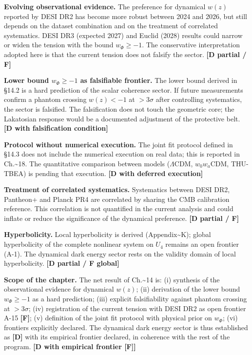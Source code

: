 ﻿\documentclass[11pt,letterpaper]{article}
\begin{document}
\textbf{Evolving observational evidence.} The preference for dynamical $w(z)$ reported by DESI DR2 has become more robust between 2024 and 2026, but still depends on the dataset combination and on the treatment of correlated systematics. DESI DR3 (expected 2027) and Euclid (2028) results could narrow or widen the tension with the bound $w_\Phi \geq -1$. The conservative interpretation adopted here is that the current tension does not falsify the sector. \textbf{[D partial / F]}

\textbf{Lower bound $w_\Phi \geq -1$ as falsifiable frontier.} The lower bound derived in §14.2 is a hard prediction of the scalar coherence sector. If future measurements confirm a phantom crossing $w(z) < -1$ at $> 3\sigma$ after controlling systematics, the sector is falsified. The falsification does not touch the geometric core; the Lakatosian response would be a documented adjustment of the protective belt. \textbf{[D with falsification condition]}

\textbf{Protocol without numerical execution.} The joint fit protocol defined in §14.3 does not include the numerical execution on real data; this is reported in Ch.\textasciitilde{}18. The quantitative comparison between models ($\Lambda$CDM, $w_0w_a$CDM, THU-TBEA) is pending that execution. \textbf{[D with deferred execution]}

\textbf{Treatment of correlated systematics.} Systematics between DESI DR2, Pantheon+ and Planck PR4 are correlated by sharing the CMB calibration reference. This correlation is not quantified in the current analysis and could inflate or reduce the significance of the dynamical preference. \textbf{[D partial / F]}

\textbf{Hyperbolicity.} Local hyperbolicity is derived (Appendix\textasciitilde{}K); global hyperbolicity of the complete nonlinear system on $U_4$ remains an open frontier (A-1). The dynamical dark energy sector rests on the validity domain of local hyperbolicity. \textbf{[D partial / F global]}

\textbf{Scope of the chapter.} The net result of Ch.\textasciitilde{}14 is: (i) synthesis of the observational evidence for dynamical $w(z)$; (ii) derivation of the lower bound $w_\Phi \geq -1$ as a hard prediction; (iii) explicit falsifiability against phantom crossing at $> 3\sigma$; (iv) registration of the current tension with DESI DR2 as open frontier A-15 \textbf{[F]}; (v) definition of the joint fit protocol with physical prior on $w_\Phi$; (vi) frontiers explicitly declared. The dynamical dark energy sector is thus established as \textbf{[D]} with its empirical frontier declared, in coherence with the rest of the program. \textbf{[D with empirical frontier [F]]}
\end{document}
